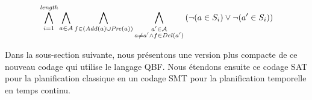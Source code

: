 \begin{small}
\[
\bigwedge\limits_{\substack{i=1}}^{\textit{length}}\bigwedge\limits_{\substack{\substack{a\in \mathcal{A}}}}\bigwedge\limits_{\substack{\substack{f\in \left(\mathit{Add}(a)\cup\mathit{Pre}(a)\right)}}}\bigwedge\limits_{\substack{\substack{a'\in \mathcal{A}\\a \neq a' \wedge f \in \mathit{Del}(a')}}}\left(\neg (a \in S_{i}) \vee \neg (a' \in S_{i})\right)
\]
\end{small}


Dans la sous-section suivante, nous présentons une version plus compacte de ce nouveau codage qui utilise le langage QBF. Nous étendons ensuite ce codage SAT pour la planification classique en un codage SMT pour la planification temporelle en temps continu.
